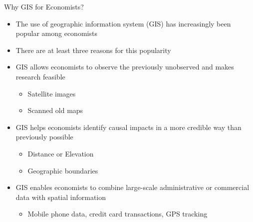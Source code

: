 \documentclass[dvipsnames,hyperref={pdfpagelabels=false}]{beamer}
\begin{document}


\begin{frame}{Why GIS for Economists?}{}
\begin{itemize}
	\item The use of geographic information system (GIS) has
	increasingly been popular among economists
	\vspace{0.2cm}
	\item There are at least three reasons for this popularity
	\vspace{0.2cm}
	\item[1] GIS allows economists to observe the previously unobserved
	and makes research feasible
	\vspace{0.2cm}
	\begin{itemize}
		\item Satellite images
		\vspace{0.2cm}
		\item Scanned old maps
		\vspace{0.2cm}
	\end{itemize}
	\item[2] GIS helps economists identify causal impacts in a more credible way than previously possible
	\begin{itemize}
		\vspace{0.2cm}
		\item Distance or Elevation
		\vspace{0.2cm}
		\item Geographic boundaries
	\end{itemize}
	\vspace{0.2cm}
	\item[3] GIS enables economists to combine large-scale administrative or commercial data with spatial information
	\begin{itemize}
		\vspace{0.2cm}
		\item Mobile phone data, credit card transactions, GPS tracking
	\end{itemize}
\end{itemize}
\end{frame}
\end{document}
